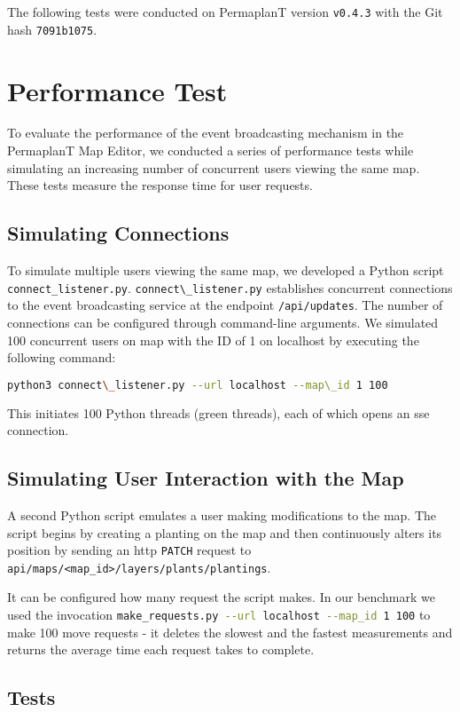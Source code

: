 \documentclass[final,oneside]{vutinfth}
\newcommand{\bashsnippet}[1]{\lstinline[language=bash]{#1}}
\newcommand{\urlsnippet}[1]{\lstinline[language=url]{#1}}
\begin{document}
The following tests were conducted on PermaplanT version \texttt{v0.4.3} with the Git hash \texttt{7091b1075}.

\section{Performance Test}

To evaluate the performance of the event broadcasting mechanism in the PermaplanT Map Editor, we conducted a series of performance tests while simulating an increasing number of concurrent users viewing the same map.
These tests measure the response time for user requests.

\subsection{Simulating Connections}
To simulate multiple users viewing the same map, we developed a Python script \bashsnippet{connect_listener.py}.
\bashsnippet{connect\_listener.py} establishes concurrent connections to the event broadcasting service at the endpoint \urlsnippet{/api/updates}.
The number of connections can be configured through command-line arguments.
We simulated 100 concurrent users on map with the ID of 1 on localhost by executing the following command: 
\begin{lstlisting}[language=bash]
python3 connect\_listener.py --url localhost --map\_id 1 100
\end{lstlisting}
This initiates 100 Python threads (green threads), each of which opens an \gls{sse} connection.  

\subsection{Simulating User Interaction with the Map}
A second Python script emulates a user making modifications to the map.
The script begins by creating a planting on the map and then continuously alters its position by sending an \gls{http} \texttt{PATCH} request to \urlsnippet{api/maps/<map_id>/layers/plants/plantings}.

It can be configured how many request the script makes.
In our benchmark we used the invocation \bashsnippet{make_requests.py --url localhost --map_id 1 100} to make
100 move requests - it deletes the slowest and the fastest measurements and returns the average time each request takes to complete.
    
\subsection{Tests}
\end{document}

